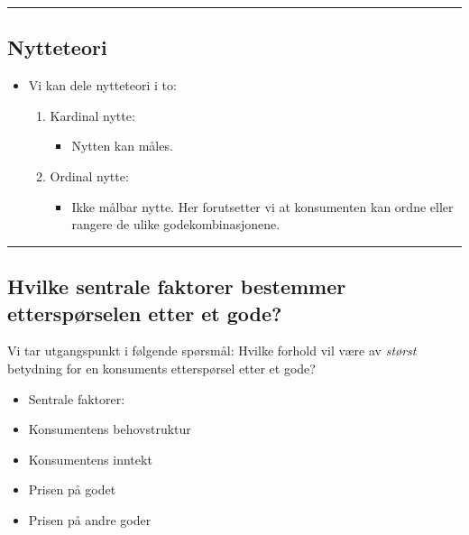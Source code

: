 \documentclass[
  letterpaper,
  DIV=11,
  numbers=noendperiod]{scrartcl}
\providecommand{\tightlist}{%
  \setlength{\itemsep}{0pt}\setlength{\parskip}{0pt}}\usepackage{longtable,booktabs,array}
\begin{document}
\begin{center}\rule{0.5\linewidth}{0.5pt}\end{center}

\subsection{Nytteteori}\label{nytteteori}

\begin{itemize}
\tightlist
\item
  Vi kan dele nytteteori i to:

  \begin{enumerate}
  \def\labelenumi{\arabic{enumi}.}
  \tightlist
  \item
    Kardinal nytte:

    \begin{itemize}
    \tightlist
    \item
      Nytten kan måles.
    \end{itemize}
  \item
    Ordinal nytte:

    \begin{itemize}
    \tightlist
    \item
      Ikke målbar nytte. Her forutsetter vi at konsumenten kan ordne
      eller rangere de ulike godekombinasjonene.
    \end{itemize}
  \end{enumerate}
\end{itemize}

\begin{center}\rule{0.5\linewidth}{0.5pt}\end{center}

\subsection{Hvilke sentrale faktorer bestemmer etterspørselen etter et
gode?}\label{hvilke-sentrale-faktorer-bestemmer-etterspuxf8rselen-etter-et-gode}

Vi tar utgangspunkt i følgende spørsmål: Hvilke forhold vil være av
\emph{størst} betydning for en konsuments etterspørsel etter et gode?

\begin{itemize}
\tightlist
\item
  Sentrale faktorer:
\item
  Konsumentens behovstruktur
\item
  Konsumentens inntekt
\item
  Prisen på godet
\item
  Prisen på andre goder
\end{itemize}
\end{document}
